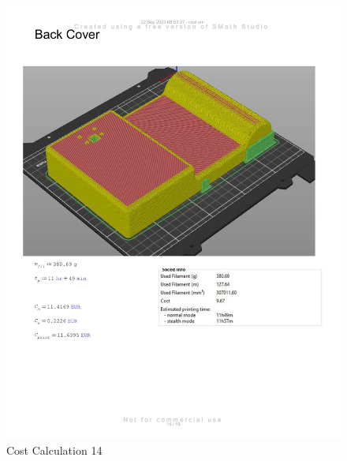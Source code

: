 \begin{figure}[H]
    \centering
    \includegraphics[width=\linewidth]{texs/appendix/data/costcalculation/cost1-14.jpg}
    \caption{Cost Calculation 14}
    \label{fig:cost-calculation-14}
\end{figure}

